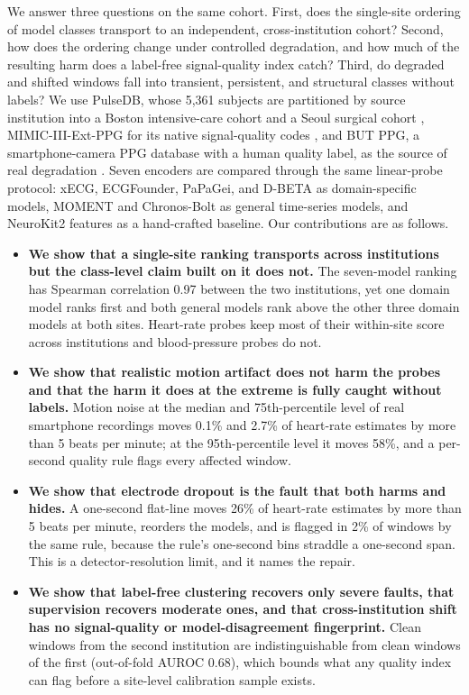 \documentclass[pmlr,twocolumn,10pt]{jmlr}
\newcommand{\domainmodel}{xECG}
\newcommand{\tsmodel}{MOMENT}
\begin{document}
We answer three questions on the same cohort. First, does the single-site ordering of model classes transport to an independent, cross-institution cohort? Second, how does the ordering change under controlled degradation, and how much of the resulting harm does a label-free signal-quality index catch? Third, do degraded and shifted windows fall into transient, persistent, and structural classes without labels? We use PulseDB, whose 5,361 subjects are partitioned by source institution into a Boston intensive-care cohort and a Seoul surgical cohort \citep{wang2023pulsedb,johnson2016mimic,lee2022vitaldb}, MIMIC-III-Ext-PPG for its native signal-quality codes \citep{mimicextppg}, and BUT PPG, a smartphone-camera PPG database with a human quality label, as the source of real degradation \citep{nemcova2021butppg}. Seven encoders are compared through the same linear-probe protocol: \domainmodel{}, ECGFounder, PaPaGei, and D-BETA as domain-specific models, \tsmodel{} and Chronos-Bolt as general time-series models, and NeuroKit2 features as a hand-crafted baseline. Our contributions are as follows.
\begin{itemize}[leftmargin=*,itemsep=2pt,topsep=3pt]
\item \textbf{We show that a single-site ranking transports across institutions but the class-level claim built on it does not.} The seven-model ranking has Spearman correlation 0.97 between the two institutions, yet one domain model ranks first and both general models rank above the other three domain models at both sites. Heart-rate probes keep most of their within-site score across institutions and blood-pressure probes do not.
\item \textbf{We show that realistic motion artifact does not harm the probes and that the harm it does at the extreme is fully caught without labels.} Motion noise at the median and 75th-percentile level of real smartphone recordings moves 0.1\% and 2.7\% of heart-rate estimates by more than 5 beats per minute; at the 95th-percentile level it moves 58\%, and a per-second quality rule flags every affected window.
\item \textbf{We show that electrode dropout is the fault that both harms and hides.} A one-second flat-line moves 26\% of heart-rate estimates by more than 5 beats per minute, reorders the models, and is flagged in 2\% of windows by the same rule, because the rule's one-second bins straddle a one-second span. This is a detector-resolution limit, and it names the repair.
\item \textbf{We show that label-free clustering recovers only severe faults, that supervision recovers moderate ones, and that cross-institution shift has no signal-quality or model-disagreement fingerprint.} Clean windows from the second institution are indistinguishable from clean windows of the first (out-of-fold AUROC 0.68), which bounds what any quality index can flag before a site-level calibration sample exists.
\end{itemize}
\end{document}
